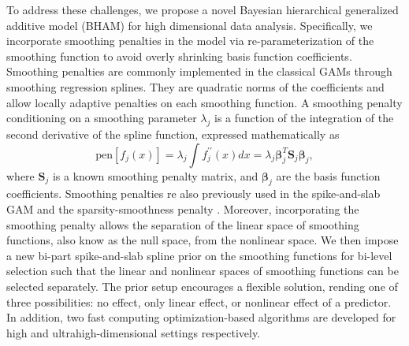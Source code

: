 \documentclass[AMA,STIX1COL,]{WileyNJD-v2}
\begin{document}
To address these challenges, we propose a novel Bayesian hierarchical
generalized additive model (BHAM) for high dimensional data analysis.
Specifically, we incorporate smoothing penalties in the model via
re-parameterization of the smoothing function to avoid overly shrinking
basis function coefficients. Smoothing penalties are commonly
implemented in the classical GAMs through smoothing regression splines.
They are quadratic norms of the coefficients and allow locally adaptive
penalties on each smoothing function. A smoothing penalty conditioning
on a smoothing parameter \(\lambda_j\) is a function of the integration
of the second derivative of the spline function, expressed
mathematically as \begin{equation}\label{eq:smoothpen}
  \text{pen}\left[f_j(x)\right] = \lambda_j \int f^{\prime\prime}_j(x)dx = \lambda_j \boldsymbol{\beta}_j^T \boldsymbol{S}_j \boldsymbol{\beta}_j ,
\end{equation} where \(\boldsymbol{S}_j\) is a known smoothing penalty
matrix, and \(\boldsymbol{\beta}_j\) are the basis function
coefficients. Smoothing penalties re also previously used in the
spike-and-slab GAM \citep{Scheipl2012} and the sparsity-smoothness
penalty \citep{Meier2009}. Moreover, incorporating the smoothing penalty
allows the separation of the linear space of smoothing functions, also
know as the null space, from the nonlinear space. We then impose a new
bi-part spike-and-slab spline prior on the smoothing functions for
bi-level selection such that the linear and nonlinear spaces of
smoothing functions can be selected separately. The prior setup
encourages a flexible solution, rending one of three possibilities: no
effect, only linear effect, or nonlinear effect of a predictor. In
addition, two fast computing optimization-based algorithms are developed
for high and ultrahigh-dimensional\citep{Fan2009} settings respectively.
\end{document}
